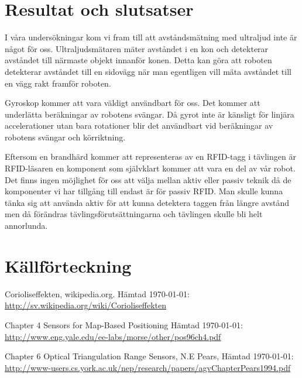\documentclass[a4paper,12pt,fleqn]{article}
\begin{document}
\section{Resultat och slutsatser}

I våra undersökningar kom vi fram till att avståndsmätning med ultraljud inte är något för oss. Ultraljudsmätaren mäter avståndet i en kon och detekterar avståndet till närmaste objekt innanför konen. Detta kan göra att roboten detekterar avståndet till en sidovägg när man egentligen vill mäta avståndet till en vägg rakt framför roboten.

Gyroskop kommer att vara väldigt användbart för oss. Det kommer att underlätta beräkningar av robotens svängar. Då gyrot inte är känsligt för linjära accelerationer utan bara rotationer blir det användbart vid beräkningar av robotens svängar och körriktning.

Eftersom en brandhärd kommer att representeras av en RFID-tagg i tävlingen är RFID-läsaren en komponent som självklart kommer att vara en del av vår robot. Det finns ingen möjlighet för oss att välja mellan aktiv eller passiv teknik då de komponenter vi har tillgång till endast är för passiv RFID. Man skulle kunna tänka sig att använda aktiv för att kunna detektera taggen från längre avstånd men då förändras tävlingsförutsättningarna och tävlingen skulle bli helt annorlunda.


\section*{Källförteckning}
\addtocounter{section}{1}

Corioliseffekten, wikipedia.org. Hämtad \today:\newline
\url{http://sv.wikipedia.org/wiki/Corioliseffekten}

Chapter 4 Sensors for Map-Based Positioning Hämtad \today:\newline
\url{http://www.eng.yale.edu/ee-labs/morse/other/pos96ch4.pdf}

Chapter 6 Optical Triangulation Range Sensors, N.E Pears, Hämtad \today:\newline 
\url{http://www-users.cs.york.ac.uk/nep/research/papers/agvChapterPears1994.pdf}
\end{document}
